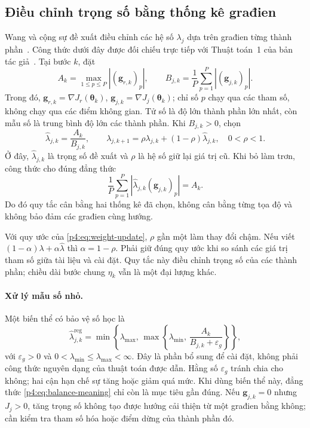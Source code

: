 \subsection{Điều chỉnh trọng số bằng thống kê građien}

Wang và cộng sự đề xuất điều chỉnh các hệ số $\lambda_j$ dựa trên
građien từng thành phần~\cite{wang2021}. Công thức dưới đây được đối
chiếu trực tiếp với Thuật toán~1 của bản tác giả~\cite{wang2020}.
Tại bước $k$, đặt
\begin{equation}
 A_k=\max_{1\leq p\leq P}|(\mathbf{g}_{r,k})_p|,
 \qquad B_{j,k}=\frac{1}{P}\sum_{p=1}^{P}|(\mathbf{g}_{j,k})_p|.
 \label{p4:eq:gradient-statistics}
\end{equation}
Trong đó, $\mathbf{g}_{r,k}=\nabla J_r(\boldsymbol{\theta}_k)$,
$\mathbf{g}_{j,k}=\nabla J_j(\boldsymbol{\theta}_k)$; chỉ số $p$ chạy
qua các tham số, không chạy qua các điểm không gian. Tử số là độ lớn
thành phần lớn nhất, còn mẫu số là trung bình độ lớn các thành phần.
Khi $B_{j,k}>0$, chọn
\begin{equation}
 \widehat\lambda_{j,k}=\frac{A_k}{B_{j,k}},
 \qquad
 \lambda_{j,k+1}=\rho\lambda_{j,k}+(1-\rho)\widehat\lambda_{j,k},
 \quad 0<\rho<1.
 \label{p4:eq:weight-update}
\end{equation}
Ở đây, $\widehat\lambda_{j,k}$ là trọng số đề xuất và $\rho$ là hệ số
giữ lại giá trị cũ. Khi bỏ làm trơn, công thức cho đúng đẳng thức
\begin{equation}
 \frac{1}{P}\sum_{p=1}^{P}
       |\widehat\lambda_{j,k}(\mathbf{g}_{j,k})_p|=A_k.
 \label{p4:eq:balance-meaning}
\end{equation}
Do đó quy tắc cân bằng hai thống kê đã chọn, không cân bằng từng tọa
độ và không bảo đảm các građien cùng hướng.

Với quy ước của \eqref{p4:eq:weight-update}, $\rho$ gần một làm thay
đổi chậm. Nếu viết $(1-\alpha)\lambda+\alpha\widehat\lambda$ thì
$\alpha=1-\rho$. Phải giữ đúng quy ước khi so sánh các giá trị tham
số giữa tài liệu và cài đặt. Quy tắc này điều chỉnh trọng số của các
thành phần; chiều dài bước chung $\eta_k$ vẫn là một đại lượng khác.

\paragraph{Xử lý mẫu số nhỏ.}
Một biến thể có bảo vệ số học là
\begin{equation}
 \widehat\lambda_{j,k}^{\mathrm{reg}}
 =\min\left\{\lambda_{\max},\,
       \max\left\{\lambda_{\min},\,
          \frac{A_k}{B_{j,k}+\varepsilon_g}\right\}\right\},
 \label{p4:eq:regularized-weight}
\end{equation}
với $\varepsilon_g>0$ và $0<\lambda_{\min}\leq\lambda_{\max}<\infty$.
Đây là phần bổ sung để cài đặt, không phải công thức nguyên dạng của
thuật toán được dẫn. Hằng số $\varepsilon_g$ tránh chia cho không;
hai cận hạn chế sự tăng hoặc giảm quá mức. Khi dùng biến thể này,
đẳng thức \eqref{p4:eq:balance-meaning} chỉ còn là mục tiêu gần đúng.
Nếu $\mathbf{g}_{j,k}=0$ nhưng $J_j>0$, tăng trọng số không tạo được
hướng cải thiện từ một građien bằng không; cần kiểm tra tham số hóa
hoặc điểm dừng của thành phần đó.


